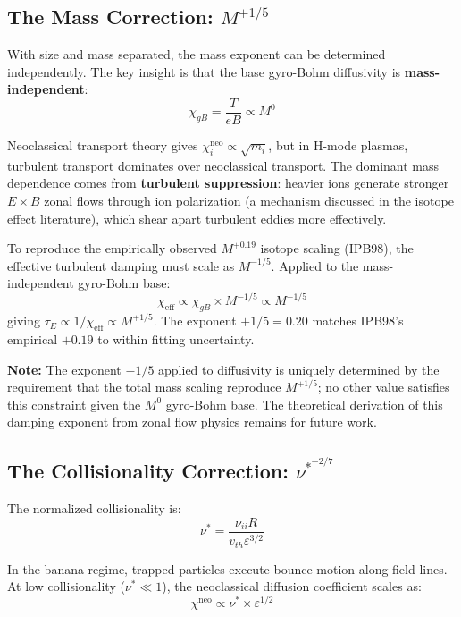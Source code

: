 \documentclass[11pt,letterpaper]{article}
\newcommand{\tauE}{\tau_E}
\newcommand{\chiGB}{\chi_{gB}}
\newcommand{\nustar}{\nu^*}
\begin{document}
\subsection{The Mass Correction: $M^{+1/5}$}

With size and mass separated, the mass exponent can be determined independently. The key insight is that the base gyro-Bohm diffusivity is \textbf{mass-independent}:
\begin{equation}
\chiGB = \frac{T}{eB} \propto M^0
\end{equation}

Neoclassical transport theory gives $\chi_i^{\text{neo}} \propto \sqrt{m_i}$, but in H-mode plasmas, turbulent transport dominates over neoclassical transport. The dominant mass dependence comes from \textbf{turbulent suppression}: heavier ions generate stronger $E \times B$ zonal flows through ion polarization (a mechanism discussed in the isotope effect literature), which shear apart turbulent eddies more effectively.

To reproduce the empirically observed $M^{+0.19}$ isotope scaling (IPB98), the effective turbulent damping must scale as $M^{-1/5}$. Applied to the mass-independent gyro-Bohm base:
\begin{equation}
\chi_{\text{eff}} \propto \chiGB \times M^{-1/5} \propto M^{-1/5}
\end{equation}
giving $\tauE \propto 1/\chi_{\text{eff}} \propto M^{+1/5}$. The exponent $+1/5 = 0.20$ matches IPB98's empirical $+0.19$ to within fitting uncertainty.

\textbf{Note:} The exponent $-1/5$ applied to diffusivity is uniquely determined by the requirement that the total mass scaling reproduce $M^{+1/5}$; no other value satisfies this constraint given the $M^0$ gyro-Bohm base. The theoretical derivation of this damping exponent from zonal flow physics remains for future work.

\subsection{The Collisionality Correction: $\nustar^{-2/7}$}

The normalized collisionality is:
\begin{equation}
\nustar = \frac{\nu_{ii} R}{v_{th} \varepsilon^{3/2}}
\end{equation}

In the banana regime, trapped particles execute bounce motion along field lines. At low collisionality ($\nustar \ll 1$), the neoclassical diffusion coefficient scales as:
\begin{equation}
\chi^{\text{neo}} \propto \nustar \times \varepsilon^{1/2}
\end{equation}
\end{document}
